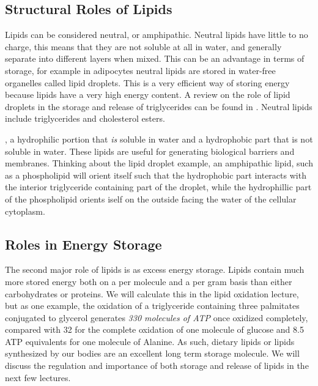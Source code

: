 \documentclass{tufte-handout}
\begin{document}
\subsection{Structural Roles of Lipids}

Lipids can be considered neutral, or amphipathic.  Neutral lipids have little to no charge, this means that they are not soluble at all in water, and generally separate into different layers when mixed.  This can be an advantage in terms of storage, for example in adipocytes neutral lipids are stored in water-free organelles called lipid droplets.  This is a very efficient way of storing energy because lipids have a very high energy content.  A review on the role of lipid droplets in the storage and release of triglycerides can be found in \citet{Walther2009}.  Neutral lipids include triglycerides and cholesterol esters.  

, a hydrophilic portion that \emph{is} soluble in water and a hydrophobic part that is not soluble in water.  These lipids are useful for generating biological barriers and membranes.  Thinking about the lipid droplet example, an amphipathic lipid, such as a phospholipid will orient itself such that the hydrophobic part interacts with the interior triglyceride containing part of the droplet, while the hydrophillic part of the phospholipid orients iself on the outside facing the water of the cellular cytoplasm.  

\subsection{Roles in Energy Storage}

The second major role of lipids is as excess energy storage.  Lipids contain much more stored energy both on a per molecule and a per gram basis than either carbohydrates or proteins.  We will calculate this in the lipid oxidation lecture, but as one example, the oxidation of a triglyceride containing three palmitates conjugated to glycerol generates \emph{330 molecules of ATP} once oxidized completely, compared with 32 for the complete oxidation of one molecule of glucose and 8.5 ATP equivalents for one molecule of Alanine. As such, dietary lipids or lipids synthesized by our bodies are an excellent long term storage molecule.  We will discuss the regulation and importance of both storage and release of lipids in the next few lectures.
\end{document}
